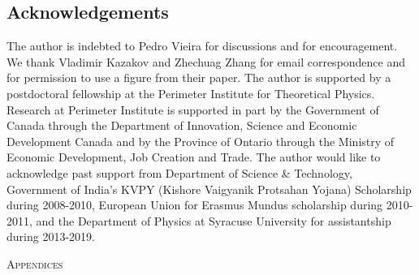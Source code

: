 \documentclass[11pt]{article}
\begin{document}
\subsection*{Acknowledgements}
The author is indebted to Pedro Vieira
for discussions and for encouragement. We thank Vladimir Kazakov 
and Zhechuag Zhang for email correspondence and for permission to use a 
figure from their paper. The author is supported by a postdoctoral fellowship 
at the Perimeter Institute for Theoretical Physics. Research at Perimeter Institute is supported 
in part by the Government of Canada through the Department of Innovation, Science and 
Economic Development Canada and by the Province of Ontario through 
the Ministry of Economic Development, Job Creation and Trade.
The author would like to acknowledge past support from 
Department of Science \& Technology, Government of India's KVPY
(Kishore Vaigyanik Protsahan Yojana) Scholarship during 2008-2010, 
European Union for Erasmus Mundus scholarship during 2010-2011, 
and the Department of Physics at Syracuse University for 
assistantship during 2013-2019. 
\appendix
\begin{center} \Large{\textsc{Appendices}}\end{center}
\end{document}
